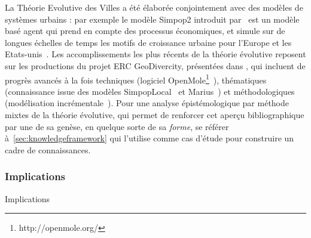La Théorie Evolutive des Villes a été élaborée conjointement avec des modèles de systèmes urbains : par exemple le modèle Simpop2 introduit par~\cite{bretagnolle2006theory} est un modèle basé agent qui prend en compte des processus économiques, et simule sur de longues échelles de temps les motifs de croissance urbaine pour l'Europe et les Etats-unis~\cite{doi:10.1177/0042098010377366}. Les accomplissements les plus récents de la théorie évolutive reposent sur les productions du projet ERC GeoDivercity, présentées dans \cite{pumain2017urban}, qui incluent de progrès avancés à la fois techniques (logiciel OpenMole\footnote{http://openmole.org/}~\cite{reuillon2013openmole}), thématiques (connaissance issue des modèles SimpopLocal~\cite{schmitt2014modelisation} et Marius~\cite{cottineau2014evolution}) et méthodologiques (modélisation incrémentale~\cite{cottineau2015incremental}). Pour une analyse épistémologique par méthode mixtes de la théorie évolutive, qui permet de renforcer cet aperçu bibliographique par une de sa genèse, en quelque sorte de sa \emph{forme}, se référer à~\ref{sec:knowledgeframework} qui l'utilise comme cas d'étude pour construire un cadre de connaissances.



\subsubsection*{Implications}{Implications}









